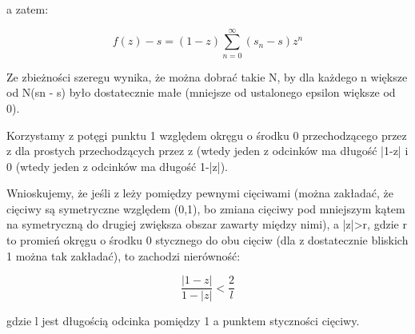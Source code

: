 \documentclass{article}
\begin{document}
a zatem: 

\[f(z)-s=(1-z)\sum _{n=0}^{\infty }(s_{n}-s)z^{n}\]

Ze zbieżności szeregu wynika, że można dobrać takie N, by dla każdego n większe od N(sn - s) było dostatecznie małe (mniejsze od ustalonego epsilon większe od 0). 

Korzystamy z potęgi punktu 1 względem okręgu o środku 0 przechodzącego przez z dla prostych przechodzących przez z (wtedy jeden z odcinków ma długość |1-z| i 0 (wtedy jeden z odcinków ma długość 1-|z|).

Wnioskujemy, że jeśli z leży pomiędzy pewnymi cięciwami (można zakładać, że cięciwy są symetryczne względem (0,1), bo zmiana cięciwy pod mniejszym kątem na symetryczną do drugiej zwiększa obszar zawarty między nimi), a |z|>r, gdzie r to promień okręgu o środku 0 stycznego do obu cięciw (dla z dostatecznie bliskich 1 można tak zakładać), to zachodzi nierówność: 

\begin{equation}
	{\frac {|1-z|}{1-|z|}}<{\frac {2}{l}}
\end{equation}

gdzie l jest długością odcinka pomiędzy 1 a punktem styczności cięciwy.  
\end{document}
